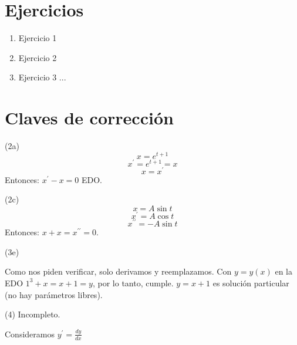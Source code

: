 \section{Ejercicios}

\begin{enumerate}

\item Ejercicio 1
\item Ejercicio 2
\item Ejercicio 3 ...

\end{enumerate}

\section{Claves de correcci\'on}

\begin{exercise}
(2a)
$$x = e^{t+1}$$
$$x^{\prime} = e ^{t + 1} = x$$
$$x = x^{\prime}$$
Entonces: $x^{\prime} - x = 0$ EDO.

\end{exercise}

\begin{exercise}
(2c)
$$x = A \sin{t}$$
$$x^{\prime} = A \cos{t}$$
$$x^{\prime \prime} = - A \sin{t}$$
Entonces: $x + x = x^{\prime \prime} = 0$.

\end{exercise}

\begin{exercise}
(3e)

Como nos piden verificar, solo derivamos y reemplazamos. Con $y = y(x)$ en la EDO $1^3 + x = x + 1 = y$, por lo tanto, cumple.
$y = x + 1$ es soluci\'on particular (no hay par\'ametros libres).

\end{exercise}

\begin{exercise}
(4) Incompleto.

Consideramos $y^{\prime} = \frac{dy}{dx}$

\end{exercise}

